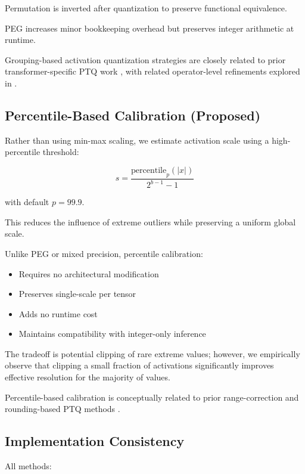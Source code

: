 \documentclass[conference]{IEEEtran}
\begin{document}
Permutation is inverted after quantization to preserve functional equivalence.

PEG increases minor bookkeeping overhead but preserves integer arithmetic at runtime.

Grouping-based activation quantization strategies are closely related to prior transformer-specific PTQ work \cite{bondarenko2021understanding}, with related operator-level refinements explored in \cite{xiao2023smoothquant,yao2022zeroquant}.

\subsection{Percentile-Based Calibration (Proposed)}

Rather than using min-max scaling, we estimate activation scale using a high-percentile threshold:

\begin{equation}
s = \frac{\mathrm{percentile}_{p}(|x|)}{2^{b-1}-1}
\end{equation}

with default $p=99.9$.

This reduces the influence of extreme outliers while preserving a uniform global scale.

Unlike PEG or mixed precision, percentile calibration:

\begin{itemize}
\item Requires no architectural modification
\item Preserves single-scale per tensor
\item Adds no runtime cost
\item Maintains compatibility with integer-only inference
\end{itemize}

The tradeoff is potential clipping of rare extreme values; however, we empirically observe that clipping a small fraction of activations significantly improves effective resolution for the majority of values.

Percentile-based calibration is conceptually related to prior range-correction and rounding-based PTQ methods \cite{nagel2020data,nagel2019up}.

\subsection{Implementation Consistency}

All methods:
\end{document}
